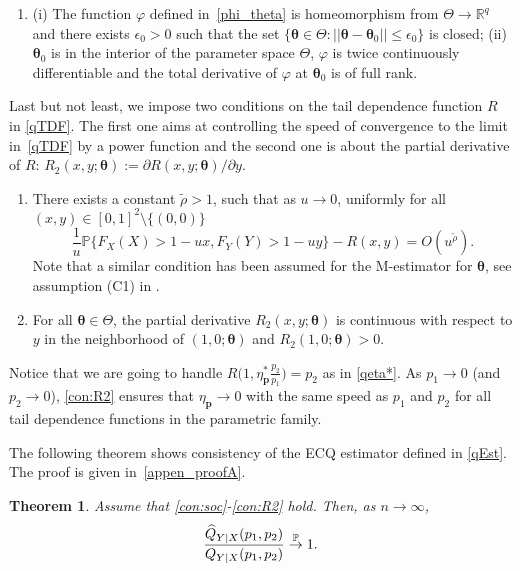 \documentclass[11pt,letterpaper]{article}
\def\h{\eta}
\def\pb{{\mathbf p}}
\def\thb{\boldsymbol{\theta}}
\def\pbb{{\mathbb P}}
\def\rbb{{\mathbb R}}
\def\top{\buildrel\pbb\over\rightarrow}
\newtheorem{theorem}{Theorem}[section]
\numberwithin{equation}{section}
\begin{document}
\begin{enumerate}[label=\textbf{Condition} \Alph{enumi}., ref=Condition \Alph{enumi}, wide=0pt]
\addtocounter{enumi}{+3}
    \item \label{con:varphi} (i) The function $\varphi$ defined in~\eqref{phi_theta} is homeomorphism from $\Theta \to \rbb^q$ and there exists $\epsilon_0 > 0$ such that the set $\{\thb \in \Theta: ||\thb - \thb_0||\leq \epsilon_0\}$ is closed; (ii) $\thb_0$ is in the interior of the parameter space $\Theta$, $\varphi$ is twice continuously differentiable and the total derivative of $\varphi$ at $\thb_0$ is of full rank.
\end{enumerate}

Last but not least, we impose two conditions on the tail dependence function $R$ in \eqref{qTDF}. The first one aims at controlling the speed of convergence to the limit in~\eqref{qTDF} by a power function and the second one is about the partial derivative of $R$: $R_2(x,y;\thb):=\partial R(x,y;\thb)/\partial y $.
\begin{enumerate}[label=\textbf{Condition} \Alph{enumi}., ref=Condition \Alph{enumi}, wide=0pt]
\addtocounter{enumi}{+4}
    \item \label{con:soc for R} There exists a constant $\tilde\rho>1$, such that as $u\to 0$, uniformly for all $(x,y)\in[0,1]^2\setminus\{(0,0)\}$
\begin{equation}\label{eq:soc for R}
    \frac{1}{u}\pbb\bigl\{F_X(X)>1-ux,F_Y(Y)>1-uy\bigr\}-R(x,y)=O(u^{\tilde\rho}).
\end{equation}
Note that a similar condition has been assumed for the M-estimator for $\thb$, see assumption (C1) in \cite{Einmahl_etal2012}.

\item \label{con:R2} For all $\thb\in \Theta$, the partial derivative $R_2(x,y;\thb)$ is continuous with respect to $y$ in the neighborhood of $(1,0;\thb)$ and $R_2(1,0;\thb)>0$.
\end{enumerate}
Notice that we are going to handle $R\Big(1,\h_\pb^*\frac{p_2}{p_1}\Big) = p_2$ as in \eqref{qeta*}. As $p_1\to 0$ (and $p_2\to0$), \ref{con:R2} ensures that  $\h_\pb\to 0$ with the same speed as $p_1$ and $p_2$ for all tail dependence functions in the parametric family.


The following theorem shows consistency of the ECQ estimator defined in \eqref{qEst}. The proof is given in~\ref{appen_proofA}.
\begin{theorem} 
\label{main theorem}
    Assume that \ref{con:soc}-\ref{con:R2} hold. Then, as $n\to\infty$,
    $$\frac{\widehat Q_{Y|X}(p_1,p_2)}{Q_{Y|X}(p_1,p_2)}\top 1.$$
\end{theorem}
\end{document}
